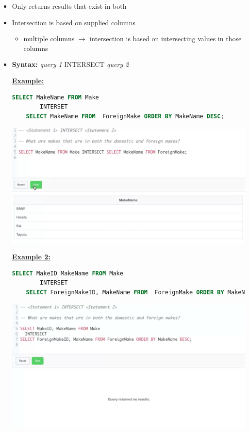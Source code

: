 \documentclass[12pt]{article}
\begin{document}
\begin{itemize}
    \item Only returns results that exist in both
    \item Intersection is based on supplied columns
    \begin{itemize}
        \item multiple columns $\to$ intersection is based on intersecting values in those columns
    \end{itemize}
    \item \textbf{Syntax:} \textit{query 1} INTERSECT \textit{query 2}

    \bigskip

    \underline{\textbf{Example:}}

    \bigskip

    \begin{lstlisting}[language=SQL]
    SELECT MakeName FROM Make
        INTERSET
    SELECT MakeName FROM  ForeignMake ORDER BY MakeName DESC;
    \end{lstlisting}

    \bigskip

    \begin{center}
    \includegraphics[width=\linewidth]{images/part_5_notes_4.png}
    \end{center}

    \bigskip

    \underline{\textbf{Example 2:}}

    \bigskip

    \begin{lstlisting}[language=SQL]
    SELECT MakeID MakeName FROM Make
        INTERSET
    SELECT ForeignMakeID, MakeName FROM  ForeignMake ORDER BY MakeName DESC; // <- Returns empty result
    \end{lstlisting}

    \begin{center}
    \includegraphics[width=\linewidth]{images/part_5_notes_5.png}
    \end{center}


\end{itemize}
\end{document}
